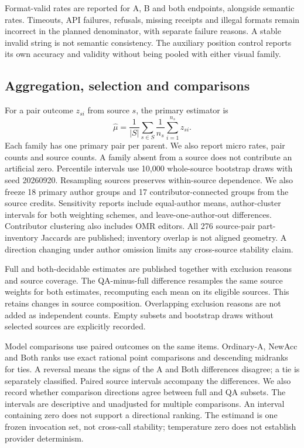 \documentclass[10pt,twocolumn,letterpaper]{article}
\begin{document}
Format-valid rates are reported for A, B and both endpoints, alongside
semantic rates. Timeouts, API failures, refusals, missing receipts and
illegal formats remain incorrect in the planned denominator, with
separate failure reasons. A stable invalid string is not semantic
consistency. The auxiliary position control reports its own accuracy
and validity without being pooled with either visual family.

\subsection{Aggregation, selection and comparisons}
For a pair outcome $z_{si}$ from source $s$, the primary estimator is
\begin{equation}
\widehat\mu=\frac{1}{|S|}\sum_{s\in S}
                 \frac{1}{n_s}\sum_{i=1}^{n_s}z_{si}.
\end{equation}
Each family has one primary pair per parent. We also report micro
rates, pair counts and source counts. A family absent from a source
does not contribute an artificial zero. Percentile intervals use
10,000 whole-source bootstrap draws with seed 20260920. Resampling
sources preserves within-source dependence. We also freeze 18 primary
author groups and 17 contributor-connected groups from the source credits.
Sensitivity reports include equal-author means, author-cluster intervals
for both weighting schemes, and leave-one-author-out differences.
Contributor clustering also includes OMR editors. All 276 source-pair
part-inventory Jaccards are published; inventory overlap is not aligned
geometry. A direction changing under author omission limits any
cross-source stability claim.

Full and both-decidable estimates are published together with exclusion
reasons and source coverage. The QA-minus-full difference resamples
the same source weights for both estimates, recomputing each mean
on its eligible sources. This retains changes in source composition.
Overlapping exclusion reasons are not added as independent counts.
Empty subsets and bootstrap draws without selected sources are
explicitly recorded.

Model comparisons use paired outcomes on the same items. Ordinary-A,
NewAcc and Both ranks use exact rational point comparisons and
descending midranks for ties. A reversal means the signs of the A
and Both differences disagree; a tie is separately classified.
Paired source intervals accompany the differences. We also record
whether comparison directions agree between full and QA subsets.
The intervals are descriptive and unadjusted for multiple comparisons.
An interval containing zero does not support a directional ranking.
The estimand is one frozen invocation set, not cross-call stability;
temperature zero does not establish provider determinism.
\end{document}
